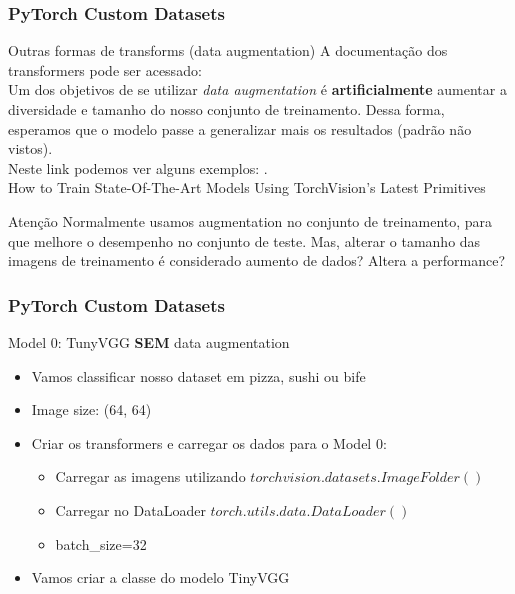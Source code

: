 \documentclass{beamer}
\begin{document}
\begin{frame}
	\frametitle{PyTorch Custom Datasets}
	\begin{block}{Outras formas de transforms (data augmentation)}
		A documentação dos transformers pode ser acessado: \href{https://pytorch.org/vision/stable/transforms.html}{} \\
		Um dos objetivos de se utilizar \textit{data augmentation} é \textbf{artificialmente} aumentar a diversidade e tamanho do nosso conjunto de treinamento.
		Dessa forma, esperamos que o modelo passe a generalizar mais os resultados (padrão não vistos).\\
		Neste link podemos ver alguns exemplos: \href{https://pytorch.org/vision/stable/auto_examples/plot_transforms.html\#illustration-of-transforms}{}. \\
		How to Train State-Of-The-Art Models Using TorchVision’s Latest Primitives \href{https://pytorch.org/blog/how-to-train-state-of-the-art-models-using-torchvision-latest-primitives/\#break-down-of-key-accuracy-improvements}{} 
	\end{block}
	\begin{alertblock}{Atenção}
		Normalmente usamos augmentation no conjunto de treinamento, para que melhore o desempenho no conjunto de teste. Mas, alterar o tamanho das imagens de treinamento é considerado aumento de dados? Altera a performance?
	\end{alertblock}
\end{frame}
\begin{frame}
	\frametitle{PyTorch Custom Datasets}
	\begin{block}{Model 0: TunyVGG \textbf{SEM} data augmentation}
		\begin{itemize}
			\item Vamos classificar nosso dataset em pizza, sushi ou bife
			\item Image size: (64, 64)
			\item Criar os transformers e carregar os dados para o Model 0:
			\begin{itemize}
				\item Carregar as imagens utilizando $torchvision.datasets.ImageFolder()$
				\item Carregar no DataLoader $torch.utils.data.DataLoader()$ 
				\item batch\_size=32
			\end{itemize}
			\item Vamos criar a classe do modelo TinyVGG
		\end{itemize}
	\end{block}
\end{frame}           
\end{document}
